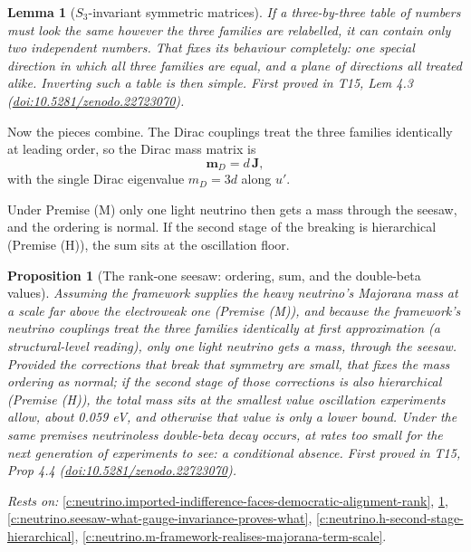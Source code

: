 \documentclass[11pt]{article}
\newtheorem{proposition}[theorem]{Proposition}
\newtheorem{lemma}[theorem]{Lemma}
\theoremstyle{definition}
\theoremstyle{plain}
\providecommand{\J}{}\renewcommand{\J}{\mathbf{J}}
\providecommand{\mD}{}\renewcommand{\mD}{\mathbf{m}_{D}}
\begin{document}
\begin{lemma}[$S_{3}$-invariant symmetric matrices]\label{c:neutrino.invariant-symmetric-matrices}
If a three-by-three table of numbers must look the same however the three families are relabelled, it can contain only two independent numbers. That fixes its behaviour completely: one special direction in which all three families are equal, and a plane of directions all treated alike. Inverting such a table is then simple.
\emph{First proved in} T15, Lem 4.3 (\href{https://doi.org/10.5281/zenodo.22723070}{doi:10.5281/zenodo.22723070}).
\end{lemma}

Now the pieces combine. The Dirac couplings treat the three families identically at leading order, so the Dirac mass matrix is \[ \mD = d\,\J, \] with the single Dirac eigenvalue $m_{D} = 3d$ along $u'$.

Under Premise (M) only one light neutrino then gets a mass through the seesaw, and the ordering is normal. If the second stage of the breaking is hierarchical (Premise (H)), the sum sits at the oscillation floor.

\begin{proposition}[The rank-one seesaw: ordering, sum, and the double-beta values]\label{c:neutrino.rank-one-seesaw-ordering-sum-double}
Assuming the framework supplies the heavy neutrino's Majorana mass at a scale far above the electroweak one (Premise (M)), and because the framework's neutrino couplings treat the three families identically at first approximation (a structural-level reading), only one light neutrino gets a mass, through the seesaw. Provided the corrections that break that symmetry are small, that fixes the mass ordering as normal; if the second stage of those corrections is also hierarchical (Premise (H)), the total mass sits at the smallest value oscillation experiments allow, about 0.059 eV, and otherwise that value is only a lower bound. Under the same premises neutrinoless double-beta decay occurs, at rates too small for the next generation of experiments to see: a conditional absence.
\emph{First proved in} T15, Prop 4.4 (\href{https://doi.org/10.5281/zenodo.22723070}{doi:10.5281/zenodo.22723070}).
\end{proposition}
\noindent\emph{Rests on:} \ref{c:neutrino.imported-indifference-faces-democratic-alignment-rank}, \ref{c:neutrino.invariant-symmetric-matrices}, \ref{c:neutrino.seesaw-what-gauge-invariance-proves-what}, \ref{c:neutrino.h-second-stage-hierarchical}, \ref{c:neutrino.m-framework-realises-majorana-term-scale}.
\end{document}
